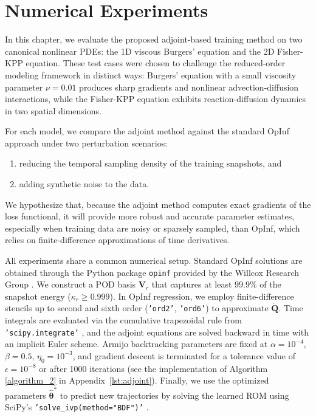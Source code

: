 \chapter{Numerical Experiments}
\label{chap:numexp}

In this chapter, we evaluate the proposed adjoint-based training method on two canonical nonlinear PDEs: the 1D viscous Burgers’ equation and the 2D Fisher-KPP equation. These test cases were chosen to challenge the reduced-order modeling framework in distinct ways: Burgers’ equation with a small viscosity parameter $\nu=0.01$ produces sharp gradients and nonlinear advection-diffusion interactions, while the Fisher-KPP equation exhibits reaction-diffusion dynamics in two spatial dimensions.  

For each model, we compare the adjoint method against the standard OpInf \cite{opinf2025} approach under two perturbation scenarios:
\begin{enumerate}[label=(\roman*)]
  \item reducing the temporal sampling density of the training snapshots, and
  \item adding synthetic noise to the data.
\end{enumerate}
We hypothesize that, because the adjoint method computes exact gradients of the loss functional, it will provide more robust and accurate parameter estimates, especially when training data are noisy or sparsely sampled, than OpInf, which relies on finite-difference approximations of time derivatives.  

All experiments share a common numerical setup. Standard OpInf solutions are obtained through the Python package \texttt{opinf} provided by the Willcox Research Group \cite{opinf2025}. We construct a POD basis $\mathbf{V}_r$ that captures at least $99.9\%$ of the snapshot energy ($\kappa_r\ge0.999$). In OpInf regression, we employ finite-difference stencils up to second and sixth order (\texttt{'ord2'}, \texttt{'ord6'}) to approximate $\dot{\mathbf{Q}}$. Time integrals are evaluated via the cumulative trapezoidal rule from \texttt{'scipy.integrate'} \cite{virtanen2020scipy}, and the adjoint equations are solved backward in time with an implicit Euler scheme. Armijo backtracking parameters are fixed at $\alpha=10^{-4}$, $\beta=0.5$, $\eta_0=10^{-3}$, and gradient descent is terminated for a tolerance value of $\epsilon=10^{-8}$ or after 1000 iterations (see the implementation of Algorithm \ref{algorithm_2} in  Appendix~\ref{lst:adjoint}). Finally, we use the optimized parameters $\hat{\bm\theta}^*$ to predict new trajectories by solving the learned ROM using SciPy's \texttt{'solve\_ivp(method="BDF")'} \cite{scipy-solveivp}.


